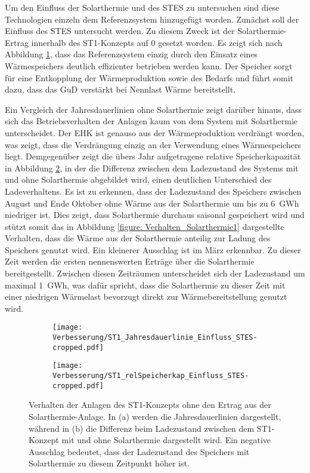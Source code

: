 Um den Einfluss der Solarthermie und des \ac{STES} zu untersuchen sind diese Technologien einzeln dem Referenzsystem hinzugefügt worden. Zunächst soll der Einfluss des \ac{STES} untersucht werden. Zu diesem Zweck ist der Solarthermie-Ertrag innerhalb des ST1-Konzepts auf 0 gesetzt worden. Es zeigt sich nach Abbildung \ref{fig: Jahresdauerlinie_Einfluss_ST1}, dass das Referenzsystem einzig durch den Einsatz eines Wärmespeichers deutlich effizienter betrieben werden kann. Der Speicher sorgt für eine Entkopplung der Wärmeproduktion sowie des Bedarfs und führt somit dazu, dass das \ac{GuD} verstärkt bei Nennlast Wärme bereitstellt. 

Ein Vergleich der Jahresdauerlinien ohne Solarthermie zeigt darüber hinaus, dass sich das Betriebsverhalten der Anlagen kaum von dem System mit Solarthermie unterscheidet. Der \ac{EHK} ist genauso aus der Wärmeproduktion verdrängt worden, was zeigt, dass die Verdrängung einzig an der Verwendung eines Wärmespeichers liegt. Demgegenüber zeigt die übers Jahr aufgetragene relative Speicherkapazität in Abbildung \ref{fig: Speicherkapazität_Einfluss_ST1}, in der die Differenz zwischen dem Ladezustand des Systems mit und ohne Solarthermie abgebildet wird, einen deutlichen Unterschied des Ladeverhaltens. Es ist zu erkennen, dass der Ladezustand des Speichers zwischen August und Ende Oktober ohne Wärme aus der Solarthermie um bis zu 6~GWh niedriger ist. Dies zeigt, dass Solarthermie durchaus saisonal gespeichert wird und stützt somit das in Abbildung \ref{figure: Verhalten_Solarthermie1} dargestellte Verhalten, dass die Wärme aus der Solarthermie anteilig zur Ladung des Speichers genutzt wird. Ein kleinerer Ausschlag ist im März erkennbar. Zu dieser Zeit werden die ersten nennenswerten Erträge über die Solarthermie bereitgestellt. Zwischen diesen Zeiträumen unterscheidet sich der Ladezustand um maximal 1~GWh, was dafür spricht, dass die Solarthermie zu dieser Zeit mit einer niedrigen Wärmelast bevorzugt direkt zur Wärmebereitstellung genutzt wird.
	\begin{figure}
		\begin{subfigure}[b]{0.48\textwidth}
			\texttt{[image: Verbesserung/ST1\_Jahresdauerlinie\_Einfluss\_STES-cropped.pdf]}
			\label{fig: Jahresdauerlinie_Einfluss_ST1}
		\end{subfigure}
		\hfill
		\begin{subfigure}[b]{0.48\textwidth}
			\texttt{[image: Verbesserung/ST1\_relSpeicherkap\_Einfluss\_STES-cropped.pdf]}
			\label{fig: Speicherkapazität_Einfluss_ST1}
		\end{subfigure}
		\caption[Verhalten der Anlagen des ST1-Konzepts ohne den Ertrag aus der Solarthermie-Anlage]{Verhalten der Anlagen des ST1-Konzepts ohne den Ertrag aus der Solarthermie-Anlage. In (a) werden die Jahresdauerlinien dargestellt, während in (b) die Differenz beim Ladezustand zwischen dem ST1-Konzept mit und ohne Solarthermie dargestellt wird. Ein negative Ausschlag bedeutet, dass der Ladezustand des Speichers mit Solarthermie zu diesem Zeitpunkt höher ist.}
		\label{fig: Einfluss}
	\end{figure}


